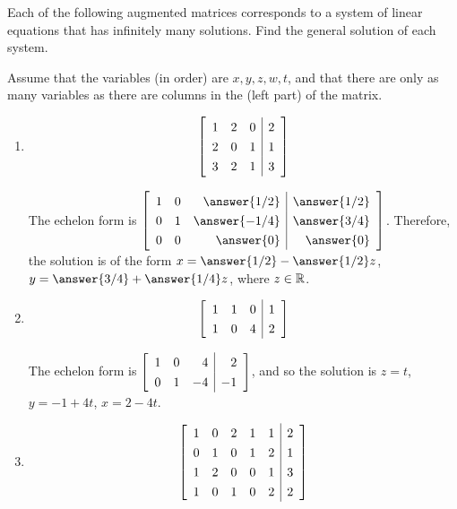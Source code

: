 \documentclass{ximera}
\author{Zack Reed}
\begin{document}
\begin{problem}

    Each of the following augmented matrices corresponds to a system of linear equations that has infinitely many solutions. Find the general solution of each system.

    Assume that the variables (in order) are $x, y, z, w, t$, and that there are only as many variables as there are columns in the (left part) of the matrix.

    \begin{enumerate}

        \item 
        \begin{equation*}    
            \startmat{rrr|r}
              1 & 2 & 0 & 2 \\
              2 & 0 & 1 & 1 \\
              3 & 2 & 1 & 3
            \stopmat
        \end{equation*}

        The echelon form is
        $\def\arraystretch{1.3}
        \startmat{rrr|r}
          1 & 0 & \answer{1/2} & \answer{1/2} \\
          0 & 1 & \answer{-1/4} & \answer{3/4} \\
          0 & 0 & \answer{0} & \answer{0}
        \stopmat$. Therefore, the solution is of the form $x=\answer{1/2}-\answer{1/2}z$, $y=\answer{3/4}+\answer{1/4}z$, where $z\in \mathbb{R}$.

        \item 
        \begin{equation*}
            \startmat{rrr|r}
              1 & 1 & 0 & 1 \\
              1 & 0 & 4 & 2
            \stopmat
        \end{equation*}

        The echelon form is 
        $\startmat{rrr|r}
          1 & 0 & 4 & 2 \\
          0 & 1 & -4 & -1
        \stopmat$, and so the solution is $z=t$, $y=-1+4t$, $x=2-4t$.


        \item 
        \begin{equation*}
            \startmat{rrrrr|r}
              1 & 0 & 2 & 1 & 1 & 2 \\
              0 & 1 & 0 & 1 & 2 & 1 \\
              1 & 2 & 0 & 0 & 1 & 3 \\
              1 & 0 & 1 & 0 & 2 & 2
            \stopmat
        \end{equation*}


\end{enumerate}
\end{problem}
\end{document}
